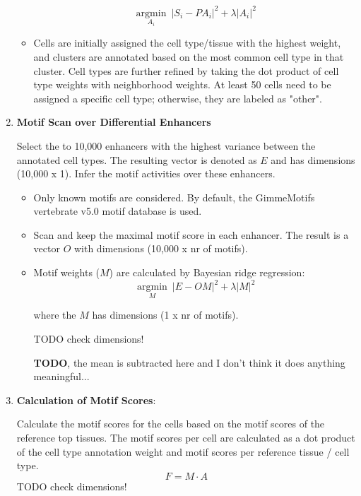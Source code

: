 \begin{enumerate}
\begin{itemize}
        \begin{equation*}
            \underset{A_i}{\operatorname{argmin}}\ |S_i - P A_i|^2 + \lambda |A_i|^2
        \end{equation*}
        
        \item Cells are initially assigned the cell type/tissue with the highest weight, and clusters are annotated based on the most common cell type in that cluster. Cell types are further refined by taking the dot product of cell type weights with neighborhood weights. At least 50 cells need to be assigned a specific cell type; otherwise, they are labeled as "other".
    \end{itemize}

    \item \textbf{Motif Scan over Differential Enhancers}
    
    Select the to 10,000 enhancers with the highest variance between the annotated cell types. The resulting vector is denoted as $E$ and has dimensions (10,000 x 1). Infer the motif activities over these enhancers. 
    
    \begin{itemize}
        \item Only known motifs are considered. By default, the GimmeMotifs\cite{Bruse_2018} vertebrate v5.0 motif database is used.
        \item Scan and keep the maximal motif score in each enhancer. The result is a vector $O$ with dimensions (10,000 x nr of motifs).
        \item Motif weights ($M$) are calculated by Bayesian ridge regression:
        \begin{equation*}
            \underset{M}{\operatorname{argmin}}\ |E - O M|^2 + \lambda |M|^2
        \end{equation*}

        where the $M$ has dimensions (1 x nr of motifs).

        TODO check dimensions!

        \textbf{TODO}, the mean is subtracted here and I don't think it does anything meaningful... 
    \end{itemize}
    

    \item \textbf{Calculation of Motif Scores}:
    
    Calculate the motif scores for the cells based on the motif scores of the reference top tissues. The motif scores per cell are calculated as a dot product of the cell type annotation weight and motif scores per reference tissue / cell type.
    \begin{equation*}
        F = M \cdot A
    \end{equation*}
    TODO check dimensions!


\end{enumerate}
